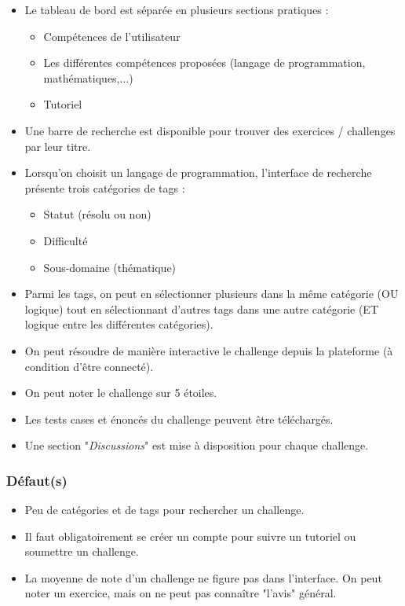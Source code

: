 \begin{itemize}
    \item Le tableau de bord est séparée en plusieurs sections pratiques :
    \begin{itemize}
        \item Compétences de l'utilisateur
        \item Les différentes compétences proposées (langage de programmation, mathématiques,...)
        \item Tutoriel
    \end{itemize}
    \item Une barre de recherche est disponible pour trouver des exercices / challenges par leur titre.
    \item Lorsqu'on choisit un langage de programmation, l'interface de recherche présente trois catégories de \glspl{tag} :
    \begin{itemize}
        \item Statut (résolu ou non)
        \item Difficulté
        \item Sous-domaine (thématique)
    \end{itemize}
    \item Parmi les \glspl{tag}, on peut en sélectionner plusieurs dans la même catégorie (OU logique) tout en sélectionnant d'autres \glspl{tag} dans une autre catégorie (ET logique entre les différentes catégories).
    \item On peut résoudre de manière interactive le challenge depuis la plateforme (à condition d'être connecté).
    \item On peut noter le challenge sur 5 étoiles.
    \item Les tests cases et énoncés du challenge peuvent être téléchargés.
    \item Une section "\textit{Discussions}" est mise à disposition pour chaque challenge.
\end{itemize}

\subsubsection*{Défaut(s)}

\begin{itemize}
    \item Peu de catégories et de \glspl{tag} pour rechercher un challenge.
    \item Il faut obligatoirement se créer un compte pour suivre un tutoriel ou soumettre un challenge.
    \item La moyenne de note d'un challenge ne figure pas dans l'interface. On peut noter un exercice, mais on ne peut pas connaître "l'avis" général.
\end{itemize}

